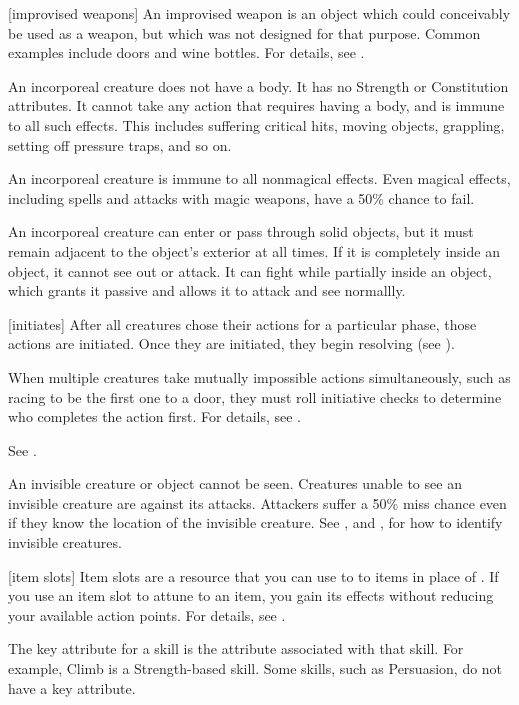 [improvised weapons] An improvised weapon is an object which could conceivably be used as a weapon, but which was not designed for that purpose.
Common examples include doors and wine bottles.
For details, see .

 An incorporeal creature does not have a body.
It has no Strength or Constitution attributes.
It cannot take any action that requires having a body, and is immune to all such effects.
This includes suffering critical hits, moving objects, grappling, setting off pressure traps, and so on.

An incorporeal creature is immune to all nonmagical effects.
Even magical effects, including spells and attacks with magic weapons, have a 50\% chance to fail.

An incorporeal creature can enter or pass through solid objects, but it must remain adjacent to the object's exterior at all times.
If it is completely inside an object, it cannot see out or attack.
It can fight while partially inside an object, which grants it passive  and allows it to attack and see normallly.

[initiates] After all creatures chose their actions for a particular phase, those actions are initiated.
Once they are initiated, they begin resolving (see ).

 When multiple creatures take mutually impossible actions simultaneously, such as racing to be the first one to a door, they must roll initiative checks to determine who completes the action first.
For details, see .

 See .

 An invisible creature or object cannot be seen. Creatures unable to see an invisible creature are  against its attacks. Attackers suffer a 50\% miss chance even if they know the location of the invisible creature. See , and , for how to identify invisible creatures.

[item slots] Item slots are a resource that you can use to  to items in place of .
If you use an item slot to attune to an item, you gain its effects without reducing your available action points.
For details, see .

 The key attribute for a skill is the attribute associated with that skill.
For example, Climb is a Strength-based skill.
Some skills, such as Persuasion, do not have a key attribute.

